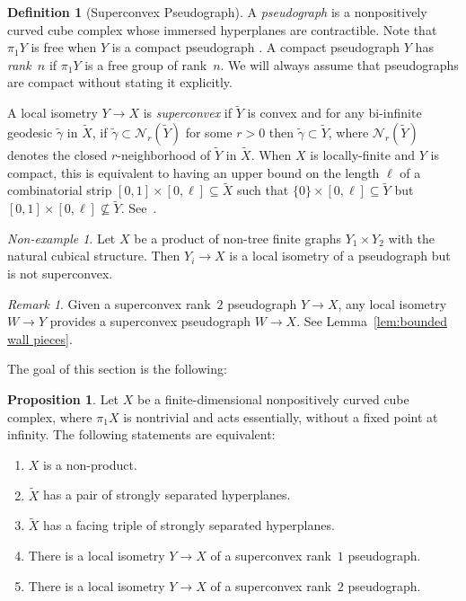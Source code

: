 \documentclass[12pt,oneside]{amsart}
\theoremstyle{definition}
\newtheorem{prop}[thm]{Proposition}
\theoremstyle{definition}
\newtheorem{defn}[thm]{Definition}
\theoremstyle{remark}
\newtheorem{nonexmp}[thm]{Non-example}
\newtheorem{remark}[thm]{Remark}
\newcommand{\neb}{\mathcal N}
\begin{document}
\begin{defn}[Superconvex Pseudograph]\label{defn:pseudograph}
A \emph{pseudograph} 
is a nonpositively curved cube complex whose immersed hyperplanes are contractible. 
Note that $\pi_1Y$ is free when $Y$ is a compact pseudograph \cite[Lem~9.9]{WiseBook}.
A compact pseudograph $Y$ has \emph{rank~$n$} if $\pi_1Y$ is a free group of rank~$n$. We will always assume that pseudographs are compact without stating it explicitly.


A local isometry $Y\rightarrow X$ is \emph{superconvex} if  $\widetilde Y$ is convex and  for any bi-infinite geodesic $\tilde \gamma$ in $\widetilde X$, if $\tilde \gamma \subset \neb_r(\widetilde Y)$ for some $r >0$ then $\tilde \gamma\subset \widetilde Y$, where $\neb_r(\widetilde Y)$ denotes the closed $r$-neighborhood of $\widetilde Y$ in $\widetilde X$. 
When $X$ is locally-finite and $Y$ is compact, this is equivalent to having an upper bound on the length $\ell$ of a combinatorial strip $[0,1]\times[0,\ell]\subseteq \widetilde X$ such that $\{0\}\times [0,\ell]\subseteq \widetilde Y$ but $[0,1]\times[0,\ell]\not\subseteq \widetilde Y$. See~\cite[Lem~2.40]{WiseBook}.
\end{defn}

\begin{nonexmp}\label{nonex: not superconvex}
    Let $X$ be a product of  non-tree finite graphs $Y_1\times Y_2$ with the natural cubical structure. Then $Y_i\to X$ is a local isometry of a pseudograph but  is not superconvex.
\end{nonexmp}

\begin{remark}\label{rem: superconvexity} Given a superconvex rank~$2$ pseudograph $Y\to X$, any local isometry $W \rightarrow Y$ provides a superconvex pseudograph $W \rightarrow X$. See Lemma~\ref{lem:bounded wall pieces}. 
\end{remark}


The goal of this section is the following:


\begin{prop}\label{prop:the core}
Let $X$ be a finite-dimensional nonpositively curved cube complex, where $\pi_1 X$ is nontrivial and acts essentially, without a fixed point at infinity. The following statements are equivalent:
\begin{enumerate}
\item\label{cond:nonproduct} $X$ is a non-product.
\item\label{cond:strongly separated pair} $\widetilde X$ has a pair of strongly separated hyperplanes.
\item\label{cond:facing triple} $\widetilde X$ has a facing triple of strongly separated hyperplanes.
\item\label{cond:rank1 pseudograph} There is a local isometry $Y\rightarrow X$ of a superconvex rank~$1$ pseudograph.
\item\label{cond:rank2 pseudograph} There is a local isometry $Y\rightarrow X$ of a superconvex rank~$2$ pseudograph.
\end{enumerate}
\end{prop}
\end{document}
